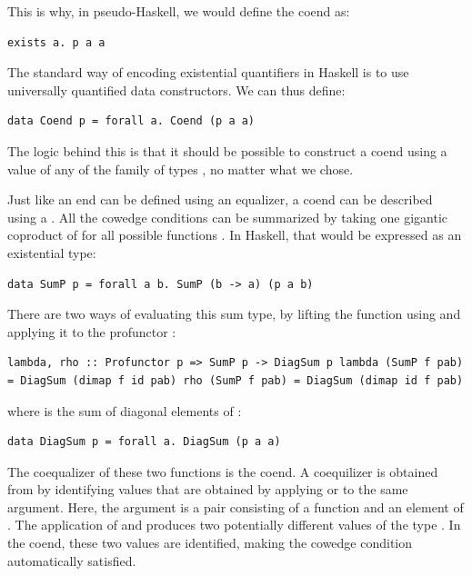 This is why, in pseudo-Haskell, we would define the coend as:

\begin{verbatim}
exists a. p a a
\end{verbatim}

The standard way of encoding existential quantifiers in Haskell is to
use universally quantified data constructors. We can thus define:

\begin{verbatim}
data Coend p = forall a. Coend (p a a)
\end{verbatim}

The logic behind this is that it should be possible to construct a coend
using a value of any of the family of types , no matter
what  we chose.

Just like an end can be defined using an equalizer, a coend can be
described using a . All the cowedge conditions can be
summarized by taking one gigantic coproduct of  for all
possible functions . In Haskell, that would be
expressed as an existential type:

\begin{verbatim}
data SumP p = forall a b. SumP (b -> a) (p a b)
\end{verbatim}

There are two ways of evaluating this sum type, by lifting the function
using  and applying it to the profunctor :

\begin{verbatim}
lambda, rho :: Profunctor p => SumP p -> DiagSum p lambda (SumP f pab) = DiagSum (dimap f id pab) rho (SumP f pab) = DiagSum (dimap id f pab)
\end{verbatim}

where  is the sum of diagonal elements of :

\begin{verbatim}
data DiagSum p = forall a. DiagSum (p a a)
\end{verbatim}

The coequalizer of these two functions is the coend. A coequilizer is
obtained from  by identifying values that are
obtained by applying  or  to the same
argument. Here, the argument is a pair consisting of a function
 and an element of . The
application of  and  produces two potentially
different values of the type . In the coend, these
two values are identified, making the cowedge condition automatically
satisfied.


